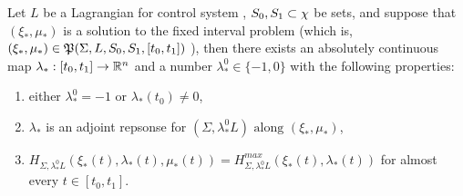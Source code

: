 \begin{teo}
	Let $L$ be a Lagrangian for control system \controlSystem, $S_0,S_1\subset\chi$ be sets, and suppose that $(\xi_*,\mu_*)$ is a solution to the fixed interval problem (which is, $(\xi_*,\mu_*)\in\mathfrak{P}(\Sigma,L,S_0,S_1,[t_0,t_1])$ ), then there exists an absolutely continuous map $\lambda_*:[t_0,t_1]\rightarrow\mathbb{R}^n$ and a number $\lambda_*^0\in\{-1,0\}$ with the following properties:
\begin{enumerate}
	\item either $\lambda_*^0=-1$ or $\lambda_*(t_0)\ne0$,
	\item $\lambda_*$ is an adjoint repsonse for $(\Sigma,\lambda_*^0L)\text{ along }(\xi_*,\mu_*)$,
	\item $H_{\Sigma,\lambda_*^0L}(\xi_*(t),\lambda_*(t),\mu_*(t))=H_{\Sigma,\lambda_*^0L}^{max}(\xi_*(t),\lambda_*(t))$ for almost every $t\in[t_0,t_1]$.
\end{enumerate}
	\label{6-3}
\end{teo}

